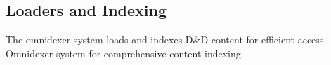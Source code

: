\documentclass[letterpaper,10pt,english]{sphinxmanual}
\begin{document}
\begin{fulllineitems}
\begin{fulllineitems}
\end{fulllineitems}


\end{fulllineitems}



\subsection{Loaders and Indexing}
\label{\detokenize{api/core:loaders-and-indexing}}
\sphinxAtStartPar
The omnidexer system loads and indexes D\&D content for efficient access.
\label{\detokenize{api/core:module-src.core.loaders.omnidexer}}
\sphinxAtStartPar
Omnidexer system for comprehensive content indexing.
\end{document}
